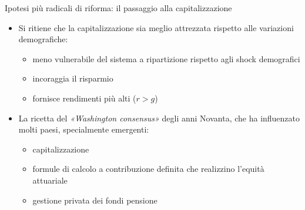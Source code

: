 \documentclass[aspectratio=64,11pt]{beamer}
\begin{document}
\begin{frame}{Ipotesi più radicali di riforma: il passaggio alla capitalizzazione}
\begin{itemize}
\item Si ritiene che la capitalizzazione sia meglio attrezzata rispetto alle
variazioni demografiche:
\begin{itemize}
\item meno vulnerabile del sistema a ripartizione rispetto agli shock
demografici
\item incoraggia il risparmio
\item fornisce rendimenti più alti ($r>g$)
\end{itemize}
\item La ricetta del \emph{«Washington consensus»} degli anni Novanta, che ha
influenzato molti paesi, specialmente emergenti:
\begin{itemize}
\item capitalizzazione
\item formule di calcolo a contribuzione definita che realizzino l'equità
attuariale
\item gestione privata dei fondi pensione
\end{itemize}
\end{itemize}
\end{frame}
\end{document}
